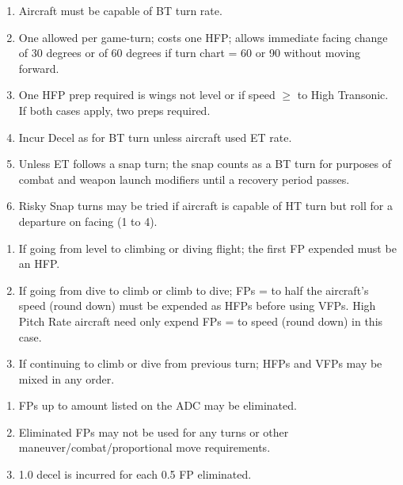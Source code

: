 \begin{table*}
\begin{multicols}{2}
\begin{enumerate}[nosep]
    \item Aircraft must be capable of BT turn rate.
    \item One allowed per game-turn; costs one HFP; allows immediate facing change of 30 degrees or of 60 degrees if turn chart = 60 or 90 without moving forward.
    \item One HFP prep required is wings not level or if speed $\ge$ to High Transonic. If both cases apply, two preps required.
    \item Incur Decel as for BT turn unless aircraft used ET rate.
    \item Unless ET follows a snap turn; the snap counts as a BT turn for purposes of combat and weapon launch modifiers until a recovery period passes.
    \item Risky Snap turns may be tried if aircraft is capable of HT turn but roll for a departure on facing (1 to 4).    
\end{enumerate}

\begin{enumerate}[nosep]
    \item If going from level to climbing or diving flight; the first FP expended must be an HFP.
    \item If going from dive to climb or climb to dive; FPs = to half the aircraft's speed (round down) must be expended as HFPs before using VFPs. High Pitch Rate aircraft need only expend FPs = to {\onethird} speed (round down) in this case.
    \item If continuing to climb or dive from previous turn; HFPs and VFPs may be mixed in any order.
\end{enumerate}

\vfill\null\columnbreak

\begin{enumerate}[nosep]
    \item FPs up to amount listed on the ADC may be eliminated.
    \item Eliminated FPs may not be used for any turns or other maneuver/combat/proportional move requirements.
    \item 1.0 decel is incurred for each 0.5 FP eliminated.
\end{enumerate}



\end{multicols}
\end{table*}
